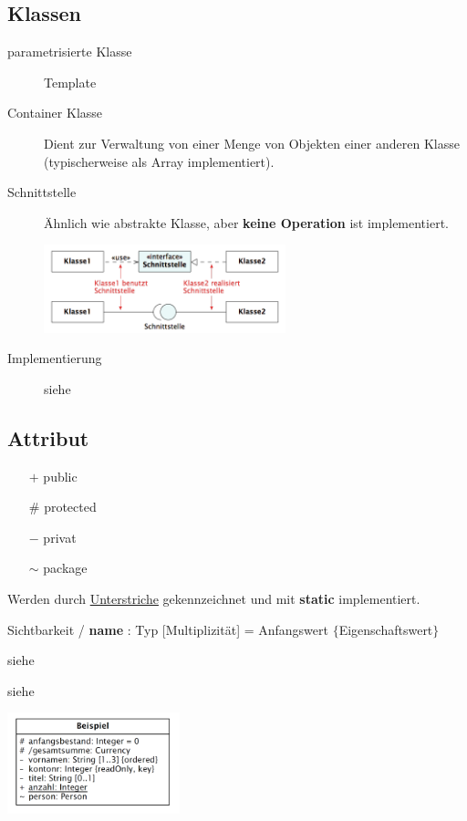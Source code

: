 \subsection{Klassen }
  \begin{description}
    \item[parametrisierte Klasse]
      Template
    \item[Container Klasse]
      Dient zur Verwaltung von einer Menge von Objekten einer anderen Klasse
      (typischerweise als Array implementiert).
    \item[Schnittstelle ]
      \parbox{5cm}{Ähnlich wie abstrakte Klasse, aber \textbf{keine Operation} ist implementiert.}
      \hspace{0.5cm}
      \parbox{7cm}{\includegraphics[width=7cm]{./images/Schnittstelle.png}}
    \item[Implementierung]
      siehe 
  \end{description}
  

\subsection{Attribut }
  \begin{description}
    \item[Sichtbarkeit]
      \begin{itemize}[leftmargin=0.5cm]
        \item[$+$] public
        \item[$\#$] protected
        \item[$-$] privat
        \item[$\sim$] package
      \end{itemize}
    \item[Klassenattribute]
      Werden durch \underline{Unterstriche} gekennzeichnet und mit \textbf{static} implementiert.
    \item[Notation]
      Sichtbarkeit / \textbf{name} : Typ [Multiplizität] = Anfangswert $\lbrace$Eigenschaftswert$\rbrace$ \\
    \parbox{6cm}{
      \item[Eigenschaftswerte]
        siehe 
      \item[Implementation]
        siehe  }
    \parbox{6cm}{\includegraphics[width=5cm]{./images/Notation_Attribute.png}}
  \end{description}
  
